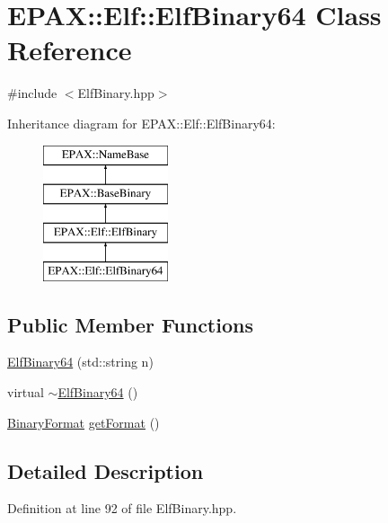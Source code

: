 \hypertarget{class_e_p_a_x_1_1_elf_1_1_elf_binary64}{\section{\-E\-P\-A\-X\-:\-:\-Elf\-:\-:\-Elf\-Binary64 \-Class \-Reference}
\label{class_e_p_a_x_1_1_elf_1_1_elf_binary64}
}


{\ttfamily \#include $<$\-Elf\-Binary.\-hpp$>$}

\-Inheritance diagram for \-E\-P\-A\-X\-:\-:\-Elf\-:\-:\-Elf\-Binary64\-:\begin{figure}[H]
\begin{center}
\leavevmode
\includegraphics[height=4.000000cm]{class_e_p_a_x_1_1_elf_1_1_elf_binary64}
\end{center}
\end{figure}
\subsection*{\-Public \-Member \-Functions}
\begin{DoxyCompactItemize}
\item 
\hyperlink{class_e_p_a_x_1_1_elf_1_1_elf_binary64_a47d6997a1bbad96ade4b7d73533ffffb}{\-Elf\-Binary64} (std\-::string n)
\item 
virtual \hyperlink{class_e_p_a_x_1_1_elf_1_1_elf_binary64_a31c48ee0193933b69f0af9dacc881b07}{$\sim$\-Elf\-Binary64} ()
\item 
\hyperlink{namespace_e_p_a_x_a4be639c006ef14def4708b37ee6dd67d}{\-Binary\-Format} \hyperlink{class_e_p_a_x_1_1_elf_1_1_elf_binary64_a8d4ac63ef8a488fb6ad98fd24ad36d07}{get\-Format} ()
\end{DoxyCompactItemize}


\subsection{\-Detailed \-Description}


\-Definition at line 92 of file \-Elf\-Binary.\-hpp.



